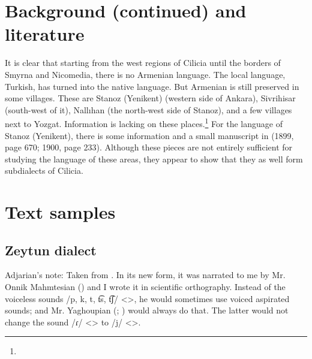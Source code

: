 \section{Background (continued) and literature}

It is clear that starting from the west regions of Cilicia until the borders of Smyrna and Nicomedia, there is no Armenian language. The local language, Turkish, has turned into the native language. But Armenian is still preserved in some villages. These are Stanoz (Yenikent) (western side of Ankara), Sivrihisar (south-west of it), Nallıhan (the north-west side of Stanoz), and a few villages next to Yozgat. Information is lacking on these places.\footnote{} For the language of Stanoz (Yenikent), there is some information and a small manuscript in  (1899, page 670; 1900, page 233). Although these pieces are not entirely sufficient for studying the language of these areas, they appear to show that they as well form subdialects of Cilicia. 


\begin{adjarianpage}\label{page:206}\end{adjarianpage}%

\section{Text samples}

{\sampleoverview}

\subsection{Zeytun dialect}

Adjarian's note: Taken from \citet[159]{Allahverdian-1884-UlniaZeytun}. In its new form, it was narrated to me by Mr. Onnik Mahmtesian () and I wrote it in scientific orthography. Instead of the voiceless sounds /p, k, t, t͡s, t͡ʃ/ <>, he would sometimes use voiced aspirated sounds; and Mr. Yaghoupian (; ) would always do that. The latter would not change the sound /ɾ/ <> to /j/ <>. 

